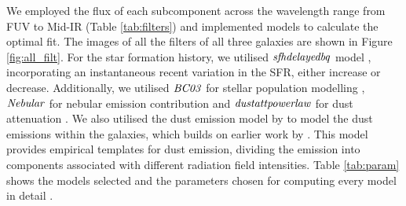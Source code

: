 \documentclass{pas}
\begin{document}
We employed the flux of each subcomponent across the wavelength range from FUV to Mid-IR (Table \ref{tab:filters}) and implemented models to calculate the optimal fit. {The images of all the filters of all three galaxies are shown in Figure \ref{fig:all_filt}.} For the star formation history, we utilised $\it{sfhdelayedbq}$ model \citep{2017Ciesla,2019Boquien}, incorporating an instantaneous recent variation in the SFR, either increase or decrease. Additionally, we utilised $\it{BC03}$ for stellar population modelling \citep{Bruzual2003}, $\it{Nebular}$ for nebular emission contribution \citep{2011Inoue} and $\it{dustatt powerlaw}$ for dust attenuation \citep{2019Boquien}. {We also utilised the dust emission model by \citet{Draine2014} to model the dust emissions within the galaxies,  which builds on earlier work by \citet{Draine2007}.  This model provides empirical templates for dust emission, dividing the emission into components associated with different radiation field intensities.}
Table \ref{tab:param} shows the models selected and the parameters chosen for computing every model in detail \citep{2019Boquien, Boquien2020}. \par
\end{document}
